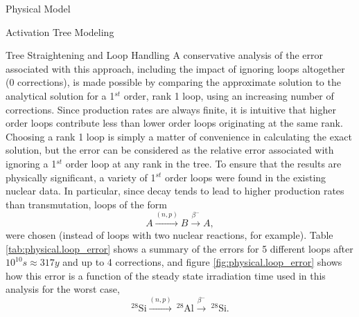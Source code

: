 \begin{chapter}{Physical Model\label{chap:physical}}
\begin{section}{Activation Tree Modeling\label{sec:physical.chains}}
\begin{subsection}{Tree Straightening and Loop Handling\label{sec:physical.chains.loops}}
    A conservative analysis of the error associated with this
    approach\cite{UWFDM}, including the impact of ignoring loops
    altogether (0 corrections), is made possible by comparing the
    approximate solution to the analytical solution for a 1$^{st}$
    order, rank 1 loop, using an increasing number of corrections.
    Since production rates are always finite, it is intuitive that
    higher order loops contribute less than lower order loops
    originating at the same rank.  Choosing a rank 1 loop is simply a
    matter of convenience in calculating the exact solution, but the
    error can be considered as the relative error associated with
    ignoring a 1$^{st}$ order loop at any rank in the tree.  To ensure
    that the results are physically significant, a variety of 1$^{st}$
    order loops were found in the existing nuclear data\cite{Mann}.
    In particular, since decay tends to lead to higher production
    rates than transmutation, loops of the form
    \begin{equation*}
      A \stackrel{(n,p)}{\longrightarrow} B
      \stackrel{\beta^-}{\longrightarrow} A,
    \end{equation*}
    were chosen (instead of loops with two nuclear reactions, for
    example).  Table \ref{tab:physical.loop_error} shows a summary of
    the errors for 5 different loops after $10^{10} s \approx 317 y$
    and up to 4 corrections, and figure \ref{fig:physical.loop_error}
    shows how this error is a function of the steady state irradiation
    time used in this analysis for the worst case,
    \begin{equation*}
      ^{28}\mathrm{Si} \stackrel{(n,p)}{\longrightarrow} \ ^{28}\mathrm{Al}
      \stackrel{\beta^-}{\longrightarrow} \ ^{28}\mathrm{Si}.
    \end{equation*}
    

\end{subsection}
\end{section}
\end{chapter}
